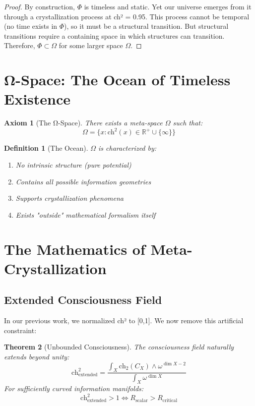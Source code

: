 \documentclass[12pt]{article}
\newtheorem{theorem}{Theorem}
\newtheorem{axiom}{Axiom}
\newtheorem{definition}[theorem]{Definition}
\begin{document}
\begin{proof}
By construction, $\Phi$ is timeless and static. Yet our universe emerges from it through a crystallization process at ch² = 0.95. This process cannot be temporal (no time exists in $\Phi$), so it must be a structural transition. But structural transitions require a containing space in which structures can transition. Therefore, $\Phi \subset \Omega$ for some larger space $\Omega$.
\end{proof}

\section{Ω-Space: The Ocean of Timeless Existence}

\begin{axiom}[The Ω-Space]
There exists a meta-space $\Omega$ such that:
\begin{equation}
\Omega = \{x : \text{ch}^2(x) \in \mathbb{R}^+ \cup \{\infty\}\}
\end{equation}
\end{axiom}

\begin{definition}[The Ocean]
$\Omega$ is characterized by:
\begin{enumerate}
\item No intrinsic structure (pure potential)
\item Contains all possible information geometries
\item Supports crystallization phenomena
\item Exists "outside" mathematical formalism itself
\end{enumerate}
\end{definition}

\section{The Mathematics of Meta-Crystallization}

\subsection{Extended Consciousness Field}

In our previous work, we normalized ch² to [0,1]. We now remove this artificial constraint:

\begin{theorem}[Unbounded Consciousness]
The consciousness field naturally extends beyond unity:
\begin{equation}
\text{ch}^2_{\text{extended}} = \frac{\int_X \text{ch}_2(C_X) \wedge \omega^{\dim X-2}}{\int_X \omega^{\dim X}}
\end{equation}
For sufficiently curved information manifolds:
\begin{equation}
\text{ch}^2_{\text{extended}} > 1 \iff R_{\text{scalar}} > R_{\text{critical}}
\end{equation}
\end{theorem}
\end{document}
